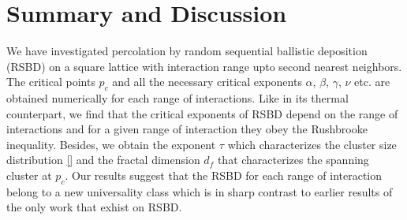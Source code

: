 
\chapter{Summary and Discussion}
\label{chapter:summary}
We have investigated percolation by random sequential ballistic deposition (RSBD) on a square lattice 
with interaction range upto second nearest neighbors. The critical points $p_c$ and all the necessary critical exponents $\alpha$, $\beta$, $\gamma$, $\nu$ etc. are obtained numerically for each range of interactions. Like  in its thermal counterpart, we find that the critical exponents of RSBD depend on the range of interactions and for a given range of interaction they obey the Rushbrooke inequality. Besides, we obtain the exponent $\tau$ which characterizes the cluster size distribution \ref{} and the fractal dimension $d_f$ that characterizes the spanning cluster at $p_c$. Our results suggest that the RSBD for each range of interaction belong to a new universality class which is in sharp contrast to earlier results of the only work that exhist on RSBD.\\


